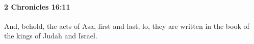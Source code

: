 
		\paragraph{2 Chronicles 16:11} %
			\label{2CHRONICLES-16-11}

			And, behold, the acts of Asa, first and last, lo, they are written in the book of the kings of Judah and Israel.


